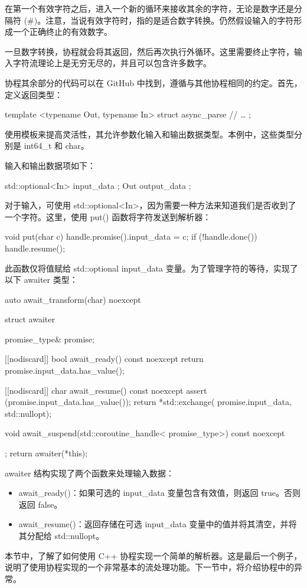 在第一个有效字符之后，进入一个新的循环来接收其余的字符，无论是数字还是分隔符 (\#)。注意，当说有效字符时，指的是适合数字转换。仍然假设输入的字符形成一个正确终止的有效数字。

一旦数字转换，协程就会将其返回，然后再次执行外循环。这里需要终止字符，输入字符流理论上是无穷无尽的，并且可以包含许多数字。

协程其余部分的代码可以在 GitHub 中找到，遵循与其他协程相同的约定。首先，定义返回类型：

\begin{cpp}
template <typename Out, typename In>
struct async_parse {
    // …
};
\end{cpp}

使用模板来提高灵活性，其允许参数化输入和输出数据类型。本例中，这些类型分别是 int64\_t 和 char。

输入和输出数据项如下：

\begin{cpp}
std::optional<In> input_data { };
Out output_data { };
\end{cpp}

对于输入，可使用 std::optional<In>，因为需要一种方法来知道我们是否收到了一个字符。这里，使用 put() 函数将字符发送到解析器：

\begin{cpp}
void put(char c) {
    handle.promise().input_data = c;
    if (!handle.done()) {
        handle.resume();
    }
}
\end{cpp}

此函数仅将值赋给 std::optional input\_data 变量。为了管理字符的等待，实现了以下 awaiter 类型：

\begin{cpp}
auto await_transform(char) noexcept {
    struct awaiter {
        promise_type& promise;

        [[nodiscard]] bool await_ready() const noexcept {
            return promise.input_data.has_value();
        }

        [[nodiscard]] char await_resume() const noexcept {
            assert (promise.input_data.has_value());
            return *std::exchange(
                            promise.input_data,
                            std::nullopt);
        }

        void await_suspend(std::coroutine_handle<
                           promise_type>) const noexcept {
        }
    };
    return awaiter(*this);
}
\end{cpp}

awaiter 结构实现了两个函数来处理输入数据：

\begin{itemize}
\item
await\_ready()：如果可选的 input\_data 变量包含有效值，则返回 true。否则返回 false。

\item
await\_resume()：返回存储在可选 input\_data 变量中的值并将其清空，并将其分配给 std::nullopt。
\end{itemize}

本节中，了解了如何使用 C++ 协程实现一个简单的解析器。这是最后一个例子，说明了使用协程实现的一个非常基本的流处理功能。下一节中，将介绍协程中的异常。











